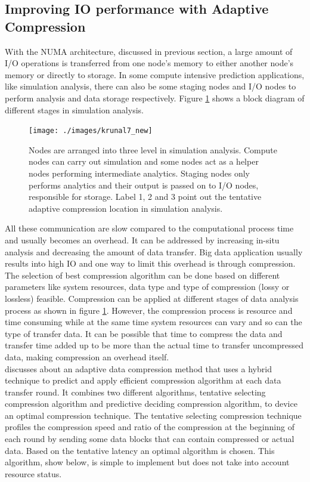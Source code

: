 \documentclass[runningheads,a4paper]{llncs}
\begin{document}
{\subsection*{Improving IO performance with Adaptive Compression}
With the NUMA architecture, discussed in previous section, a large amount of I/O operations is transferred from one node's memory to either another node's memory or directly to storage. In some compute intensive prediction applications, like simulation analysis, there can also be some staging nodes and I/O nodes to perform analysis and data storage respectively. Figure \ref{fig:krunal7}  shows a block diagram of different stages in simulation analysis. \\
\begin{figure}[!htb]
	\texttt{[image: ./images/krunal7\_new]}
	\centering
	\caption{Nodes are arranged into three level in simulation analysis. Compute nodes can carry out simulation and some nodes act as a helper nodes performing intermediate analytics. Staging nodes only performs analytics and their output is passed on to I/O nodes, responsible for storage. Label 1, 2 and 3 point out the  tentative adaptive compression location in simulation analysis.}
	\label{fig:krunal7}
	\end{figure}
	
All these communication are slow compared to the computational process time and usually becomes an overhead. It can be addressed by increasing in-situ analysis and decreasing the amount of data transfer. Big data application usually results into high IO and one way to limit this overhead is through compression. The selection of best compression algorithm can be done based on different parameters like system resources, data type and type of compression (lossy or lossless) feasible. Compression can be applied at different stages of data analysis process as shown in figure \ref{fig:krunal7}. However, the compression process is resource and time consuming while at the same time system resources can vary and so can the type of transfer data. It can be possible that time to compress the data and transfer time added up to be more than the actual time to transfer uncompressed data, making compression an overhead itself.\\

 \cite{zou2014improving} discusses about an adaptive data compression method that uses a hybrid technique to predict and apply efficient compression algorithm at each data transfer round. It combines two different algorithms, tentative selecting compression algorithm and predictive deciding compression algorithm, to device an optimal compression technique. The tentative selecting compression technique profiles the compression speed and ratio of the compression at the beginning of each round by sending some data blocks that can contain compressed or actual data. Based on the tentative latency an optimal algorithm is chosen. This algorithm, show below, is simple to implement but does not take into account resource status.\\

}
\end{document}
